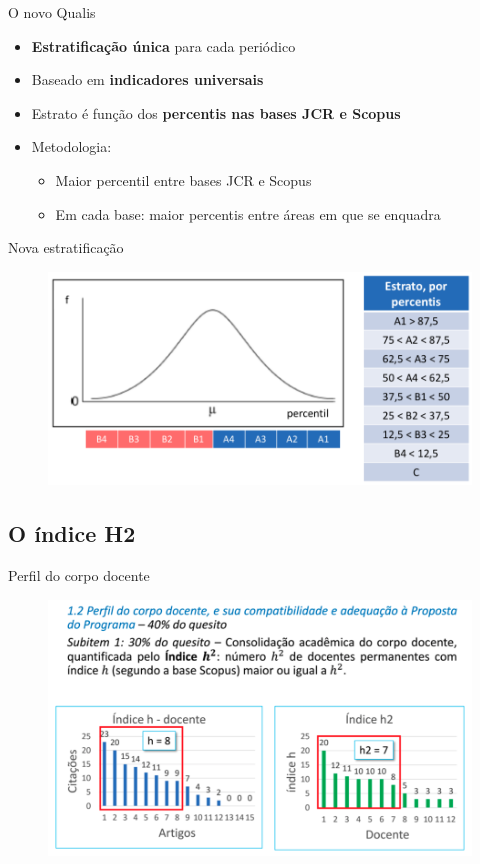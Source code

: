 \begin{frame}{O novo Qualis}
\begin{itemize}
\item \textbf{Estratificação única} para cada periódico
\item Baseado em \textbf{indicadores universais}
\item Estrato é função dos \textbf{percentis nas bases JCR e Scopus}
\item Metodologia:
\begin{itemize}
\item Maior percentil entre bases JCR e Scopus
\item Em cada base: maior percentis entre áreas em que se enquadra
\end{itemize}
\end{itemize}
\end{frame}

\begin{frame}{Nova estratificação}
\begin{figure}
\centering
\includegraphics[scale=0.35]{figs/03/estratos}
\end{figure}
\end{frame}

\subsection*{O índice H2}

\begin{frame}{Perfil do corpo docente}
\begin{figure}
\centering
\includegraphics[scale=0.35]{figs/03/indice-h2}
\end{figure}
\end{frame}

